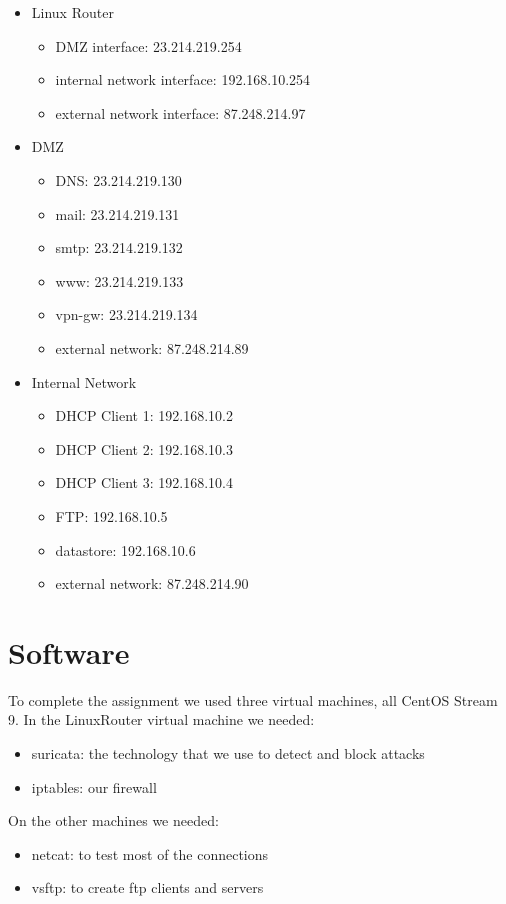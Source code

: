 \documentclass{article}
\begin{document}
\begin{itemize}
\item Linux Router
\begin{itemize}
\item DMZ interface: 23.214.219.254
\item internal network interface: 192.168.10.254
\item external network interface: 87.248.214.97
\end{itemize}
\item DMZ
\begin{itemize}
\item DNS: 23.214.219.130
\item mail: 23.214.219.131
\item smtp: 23.214.219.132
\item www: 23.214.219.133
\item vpn-gw: 23.214.219.134
\item external network: 87.248.214.89
\end{itemize}
\item Internal Network
\begin{itemize}
\item DHCP Client 1: 192.168.10.2
\item DHCP Client 2: 192.168.10.3
\item DHCP Client 3: 192.168.10.4
\item FTP: 192.168.10.5
\item datastore: 192.168.10.6
\item external network: 87.248.214.90
\end{itemize}

\end{itemize}


\section{Software}
\quad To complete the assignment we used three virtual machines, all CentOS Stream 9. In the LinuxRouter virtual machine we needed:

\begin{itemize}
    \item suricata: the technology that we use to detect and block attacks
    \item iptables: our firewall\par
\end{itemize}
On the other machines we needed:  
\begin{itemize}
    \item netcat: to test most of the connections
    \item vsftp: to create ftp clients and servers
\end{itemize}
\end{document}
